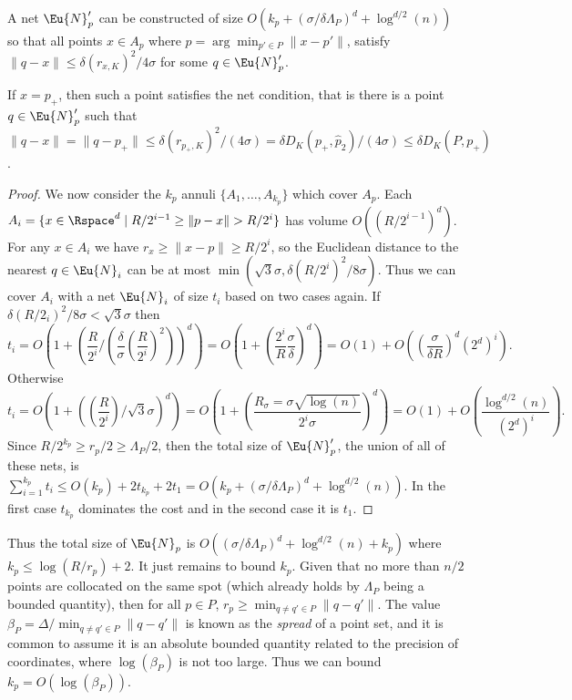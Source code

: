 \documentclass[11pt]{myclass}
\begin{document}
\begin{lemma}
\label{lem:Ann-net}
A net $\Eu{N}_p'$ can be constructed of size $O(k_p + (\sigma/ \delta \Lambda_P)^d + \log^{d/2}(n))$ so that all points $x \in A_p$ where $p = \arg \min_{p' \in P} \|x-p'\|$,  satisfy $\|q - x\| \leq \delta (r_{x,K})^2/4 \sigma$ for some $q \in \Eu{N}_p'$.  
\end{lemma}

If $x = p_+$, then such a point satisfies the net condition, that is there is a point $q \in \Eu{N}'_p$ such that   
$\|q - x\| = \| q - p_+\| \leq \delta (r_{p_+,K})^2/(4 \sigma) = \delta D_K(p_+,\hat p_2)/(4\sigma) \leq \delta D_K(P, p_+)$.  


\begin{proof}
We now consider the $k_p$ annuli $\{A_1, \ldots, A_{k_p}\}$ which cover $A_p$.  Each $A_i = \{x \in \Rspace^d \mid R/2^{i-1} \geq \|p-x\| > R/2^i\}$ has volume $O((R/2^{i-1})^d)$.  For any $x \in A_i$ we have $r_x \geq \|x-p\| \geq R/2^i$, so the Euclidean distance to the nearest $q \in \Eu{N}_i$ can be at most $\min(\sqrt{3}\sigma , \delta (R/2^i)^2/ 8\sigma)$. Thus we can cover $A_i$ with a net $\Eu{N}_i$ of size $t_i$ based on two cases again.  If $\delta (R/2_i)^2/8\sigma < \sqrt{3} \sigma$ then
\[
t_i 
= 
O\left(1 +  \left( \frac{R}{2^i} / \left(\frac{\delta}{\sigma} \left(\frac{R}{2^i}\right)^2\right)\right)^d\right)
=
O\left(1 + \left( \frac{2^i}{R} \frac{\sigma}{\delta}\right)^d\right)
=
O(1) + O\left( \left(\frac{\sigma}{\delta R}\right)^d (2^d)^i\right).
\]
Otherwise
\[
t_i 
= 
O\left( 1+ \left(\left(\frac{R}{2^i}\right) / \sqrt{3}\sigma \right)^d \right)
=
O\left( 1+ \left(\frac{R_\sigma = \sigma \sqrt{\log(n)}}{2^i \sigma }\right)^d \right)
=
O(1) + O\left(\frac{\log^{d/2}(n)}{(2^d)^i}\right).
\]
Since $R/2^{k_p} \geq r_p/2 \geq \Lambda_P/2$, then
the total size of $\Eu{N}_p'$, the union of all of these nets, is $\sum_{i=1}^{k_p} t_i \leq O(k_p) + 2t_{k_p}  + 2 t_1 = O(k_p + (\sigma/\delta \Lambda_P)^d + \log^{d/2}(n))$.  
In the first case $t_{k_p}$ dominates the cost and in the second case it is $t_1$.  
\end{proof}

Thus the total size of $\Eu{N}_p$ is $O((\sigma/\delta \Lambda_P)^d + \log^{d/2}(n) + k_p)$ where $k_p \leq \log(R/r_p)+2$.  
It just remains to bound $k_p$.  Given that no more than $n/2$ points are collocated on the same spot (which already holds by $\Lambda_P$ being a bounded quantity), then for all $p \in P$, $r_p \geq \min_{q \neq q' \in P} \|q-q'\|$.  
The value $\beta_P = \Delta / \min_{q \neq q' \in P} \|q-q'\|$ is known as the \emph{spread} of a point set, and it is common to assume it is an absolute bounded quantity related to the precision of coordinates, where $\log(\beta_P)$ is not too large.  Thus we can bound $k_p = O(\log(\beta_P))$.  
\end{document}
